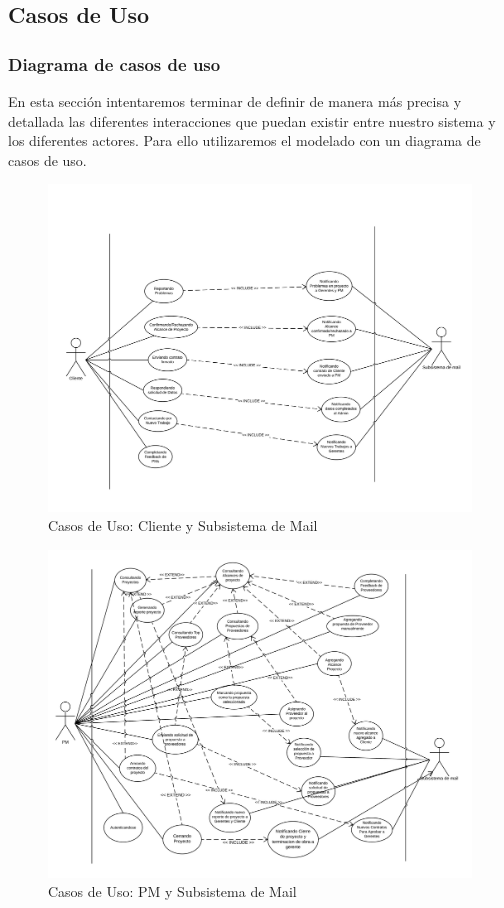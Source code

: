 \subsection{Casos de Uso}
\subsubsection{Diagrama de casos de uso}
En esta sección intentaremos terminar de definir de manera más precisa y detallada las diferentes interacciones que puedan existir entre nuestro sistema y los diferentes actores. Para ello utilizaremos el modelado con un diagrama de casos de uso.


\begin{figure}[H]
    \centering
    \includegraphics[width=\linewidth]{diag/nuevos/cu-cliente.png}
    \caption{Casos de Uso: Cliente y Subsistema de Mail}
    \label{cu1}
\end{figure}

\begin{figure}[H]
    \centering
    \includegraphics[width=\linewidth]{diag/nuevos/cu-pm.png}
    \caption{Casos de Uso: PM y Subsistema de Mail}
    \label{cu2}
\end{figure}

